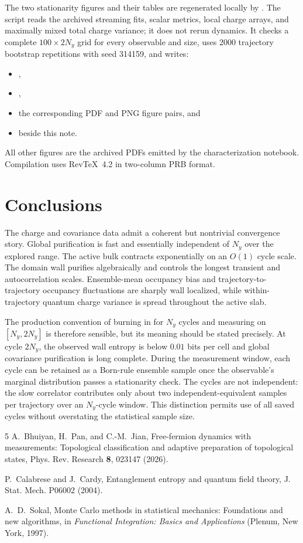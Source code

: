 \documentclass[aps,prb,twocolumn,nofootinbib,superscriptaddress,floatfix]{revtex4-2}
\begin{document}
The two stationarity figures and their tables are regenerated locally by
.  The script reads the archived
streaming fits, scalar metrics, local charge arrays, and maximally mixed total
charge variance; it does not rerun dynamics.  It checks a complete
$100\times2N_y$ grid for every observable and size, uses 2000 trajectory
bootstrap repetitions with seed 314159, and writes:
\begin{itemize}
  \item {},
  \item {},
  \item the corresponding PDF and PNG figure pairs, and
  \item {} beside this note.
\end{itemize}
All other figures are the archived PDFs emitted by the characterization
notebook.  Compilation uses RevTeX~4.2 in two-column PRB format.

\section{Conclusions}

The charge and covariance data admit a coherent but nontrivial convergence
story.  Global purification is fast and essentially independent of $N_y$ over
the explored range.  The active bulk contracts exponentially on an $O(1)$
cycle scale.  The domain wall purifies algebraically and controls the longest
transient and autocorrelation scales.  Ensemble-mean occupancy bias and
trajectory-to-trajectory occupancy fluctuations are sharply wall localized,
while within-trajectory quantum charge variance is spread throughout the
active slab.

The production convention of burning in for $N_y$ cycles and measuring on
$[N_y,2N_y]$ is therefore sensible, but its meaning should be stated precisely.
At cycle $2N_y$, the observed wall entropy is below $0.01$ bits per cell and
global covariance purification is long complete.  During the measurement
window, each cycle can be retained as a Born-rule ensemble sample once the
observable's marginal distribution passes a stationarity check.  The cycles
are not independent: the slow correlator contributes only about two
independent-equivalent samples per trajectory over an $N_y$-cycle window.
This distinction permits use of all saved cycles without overstating the
statistical sample size.

\begin{thebibliography}{5}
A.~Bhuiyan, H.~Pan, and C.-M.~Jian,
Free-fermion dynamics with measurements: Topological classification and
adaptive preparation of topological states,
Phys. Rev. Research \textbf{8}, 023147 (2026).

P.~Calabrese and J.~Cardy,
Entanglement entropy and quantum field theory,
J. Stat. Mech. P06002 (2004).

A.~D.~Sokal,
Monte Carlo methods in statistical mechanics: Foundations and new algorithms,
in \emph{Functional Integration: Basics and Applications} (Plenum, New York,
1997).
\end{thebibliography}
\end{document}

